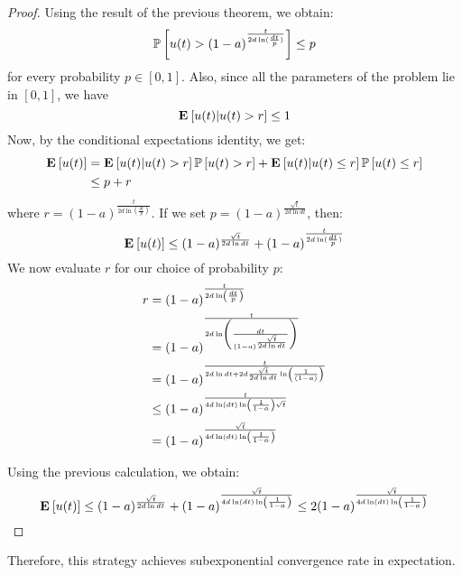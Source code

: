 \begin{proof}
Using the result of the previous theorem, we obtain:
$$ \mathbb{P}\left[u(t) > (1-a)^{\frac{t}{2d\ln( \frac{dt}{p})} }\right] \leq p $$
for every probability $p \in [0,1]$. Also, since all the parameters of the problem lie in $[0,1]$, we have
$$\Exp{u(t)|u(t) > r} \leq 1$$
Now, by the conditional expectations identity, we get:
\begin{align*}
\Exp{u(t)} &= \Exp{u(t)|u(t) > r}\Prob{u(t) > r} +\Exp{u(t)|u(t) \leq r}\Prob{u(t) \leq r}\\
&\leq p + r
\end{align*}
where $r = (1-a)^{\frac{t}{2d\ln( \frac{dt}{p})} }$. If we set $p = (1-a)^{\frac{\sqrt{t}}{2d\ln dt}}$, then:
$$
\Exp{u(t)} \leq (1-a)^{\frac{\sqrt{t}}{2d\ln dt}} + (1-a)^{\frac{t}{2d\ln( \frac{dt}{p})} }
$$
We now evaluate $r$ for our choice of probability $p$:
\begin{align*}
r
&= (1-a)^{\frac{t}{2d\ln\left( \frac{dt}{p}\right)} }\\
&= (1-a)^{\frac{t}{2d\ln\left( \frac{dt}{(1-a)^{\frac{\sqrt{t}}{2d\ln dt}}}\right)} }\\
&= (1-a)^{\frac{t}{2d\ln dt + 2d\frac{\sqrt{t}}{2d\ln dt}\ln\left( \frac{1}{(1-a)}\right) }}\\
&\leq (1-a)^{\frac{t}{4d\ln(dt)\ln\left( \frac{1}{1-a}\right) \sqrt{t}}}\\
&= (1-a)^{\frac{\sqrt{t}}{4d\ln(dt)\ln\left( \frac{1}{1-a}\right)}}
\end{align*}

Using the previous calculation, we obtain:
$$ \Exp{u(t)} \leq (1-a)^{\frac{\sqrt{t}}{2d\ln dt}} + (1-a)^{\frac{\sqrt{t}}{4d\ln(dt)\ln\lp( \frac{1}{1-a}\rp)}} \leq 2(1-a)^{\frac{\sqrt{t}}{4d\ln(dt)\ln\lp( \frac{1}{1-a}\rp)}}$$
\end{proof}
Therefore, this strategy achieves subexponential convergence rate in expectation.
